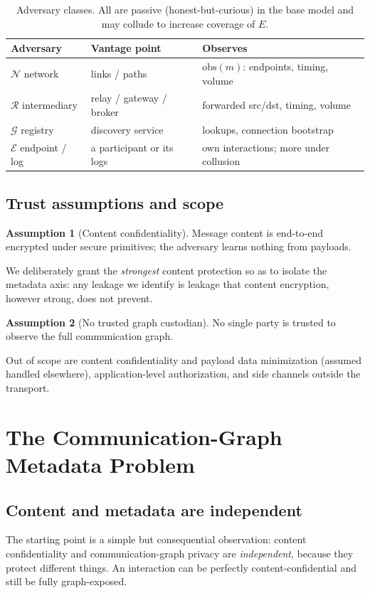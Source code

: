 \documentclass[10pt,twocolumn]{article}
\theoremstyle{definition}
\newtheorem{assumption}{Assumption}
\begin{document}
\begin{table}[t]
\centering\small
\begin{tabular}{@{}lll@{}}
\toprule
Adversary & Vantage point & Observes \\
\midrule
$\mathcal{N}$ network & links / paths & $\mathrm{obs}(m)$: endpoints, timing, volume \\
$\mathcal{R}$ intermediary & relay / gateway / broker & forwarded src/dst, timing, volume \\
$\mathcal{G}$ registry & discovery service & lookups, connection bootstrap \\
$\mathcal{E}$ endpoint / log & a participant or its logs & own interactions; more under collusion \\
\bottomrule
\end{tabular}
\caption{Adversary classes. All are passive (honest-but-curious) in the base
model and may collude to increase coverage of $E$.}
\label{tab:adv}
\end{table}

\subsection{Trust assumptions and scope}
\begin{assumption}[Content confidentiality]\label{asm:content}
Message content is end-to-end encrypted under secure primitives; the adversary
learns nothing from payloads.
\end{assumption}
We deliberately grant the \emph{strongest} content protection so as to isolate the
metadata axis: any leakage we identify is leakage that content encryption, however
strong, does not prevent.
\begin{assumption}[No trusted graph custodian]\label{asm:nocustodian}
No single party is trusted to observe the full communication graph.
\end{assumption}
Out of scope are content confidentiality and payload data minimization (assumed
handled elsewhere), application-level authorization, and side channels outside the
transport.

\section{The Communication-Graph Metadata Problem}\label{sec:problem}

\subsection{Content and metadata are independent}
The starting point is a simple but consequential observation: content
confidentiality and communication-graph privacy are \emph{independent}, because
they protect different things. An interaction can be perfectly content-confidential
and still be fully graph-exposed.
\end{document}
